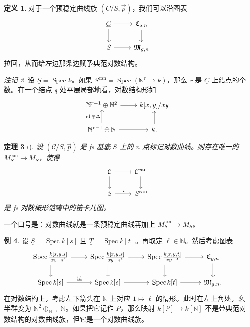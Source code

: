 \documentclass{amsart}
\newtheorem{thm}{定理}[section]
\theoremstyle{definition}
\newtheorem{defn}[thm]{定义}
\newtheorem{exm}[thm]{例}
\theoremstyle{remark}
\newtheorem{rmk}[thm]{注记}
\theoremstyle{plain}
\theoremstyle{definition}
\theoremstyle{remark}
\newcommand{\N}{\mathbb{N}}
\newcommand{\mc}[1]{\mathcal{#1}}
\newcommand{\mf}[1]{\mathfrak{#1}}
\newcommand{\on}[1]{\operatorname{#1}}
\newcommand{\ul}[1]{\underline{#1}}
\newcommand{\1}{\mathbf{1}}
\newcommand{\2}{\mathbf{2}}
\newcommand{\3}{\mathbf{3}}
\DeclareMathOperator{\Spec}{Spec}
\begin{document}
\begin{defn}
    对于一个预稳定曲线族 \((\ul{C}/\ul{S}, \vec{p})\)，我们可以沿图表
    \begin{equation*}
    \begin{tikzcd}
        \ul{C} \ar{r} \ar{d} & \mf{C}_{g,n} \ar{d} \\
        S \ar{r} & \mf{M}_{g,n}
    \end{tikzcd}
    \end{equation*}
    拉回，从而给左边那条边赋予典范对数结构。
\end{defn}

\begin{rmk}
    设 \(\ul{S} = \Spec k\)。如果 \(S^{\on{can}} = \Spec (\N^r \to k)\)，那么 \(r\) 是 \(\ul{C}\) 上结点的个数。在一个结点 \(q\) 处平展局部地看，对数结构形如
    \begin{equation*}
    \begin{tikzcd}
        \N^{r-1} \oplus \N^2 \ar{r} & k[x,y]/xy \\
        \N^{r-1} \oplus \N \ar{u}{\on{id}\oplus\Delta} \ar{r} & k \ar{u}.
    \end{tikzcd}
    \end{equation*}
\end{rmk}

\begin{thm}[{\cite{FKato2000}}]
    设 \((\mc{C}/S, \vec{p})\) 是 fs 基底 \(S\) 上的 \(n\) 点标记对数曲线。则存在唯一的 \(M_S^{\on{can}} \to M_S\)，使得
    \begin{equation*}
    \begin{tikzcd}
        \mc{C} \ar{d} \ar{r} & \mc{C}^{\on{can}} \ar{d} \\
        S \ar{r}{a} & S^{\on{can}}
    \end{tikzcd}
    \end{equation*}
    是 fs 对数概形范畴中的笛卡儿图。
\end{thm}

一个口号是：对数曲线就是一条预稳定曲线再加上 \(M_S^{\on{can}} \to M_S\)。

\begin{exm}
    设 \(\ul{S} = \Spec k[s]\) 且 \(\ul{T} = \Spec k[t]\)。再取定 \(\ell \in \N\)。然后考虑图表
    \begin{equation*}
    \begin{tikzcd}
        \Spec \frac{k{ [x,y,s] }}{xy-s^{\ell}} \ar{d} \ar{r} & \Spec \frac{k{ [x,y,s] }}{xy-s^{\ell}} \ar{d} \ar{r} & \Spec  \frac{k{[x,y,t]}}{xy-t} \ar{r}\ar{d} & \mf{C}_{g,n} \ar{d} \\
        \Spec k{[s]} \ar{r}{\ul{ \on{id} }} & \Spec {k[s]} \ar{r} & \Spec k{[t]} \ar{r} & \mf{M}_{g,n}.
    \end{tikzcd}
    \end{equation*}
    在对数结构上，考虑左下箭头在 \(\N\) 上对应 \(1 \mapsto \ell\) 的情形。此时在左上角处，幺半群变为 \(\N^2 \oplus_{\N, \ell} \N\)。如果把它记作 \(P\)，那么映射 \(k[P] \to k[\N]\) 不是带典范对数结构的对数曲线族，但它是一个对数曲线族。
\end{exm}
\end{document}
